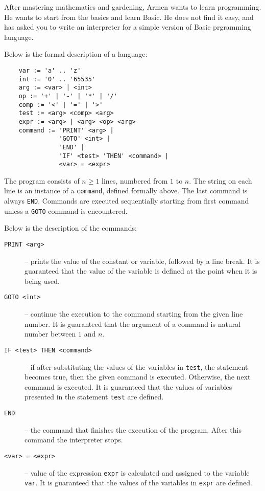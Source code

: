 
After mastering mathematics and gardening, Armen wants to learn programming.
He wants to start from the basics and learn Basic.
He does not find it easy, and has asked you to write an interpreter for a simple version of Basic prgramming language.

Below is the formal description of a language:
\begin{verbatim}
    var := 'a' .. 'z'
    int := '0' .. '65535'
    arg := <var> | <int>
    op := '+' | '-' | '*' | '/'
    comp := '<' | '=' | '>'
    test := <arg> <comp> <arg>
    expr := <arg> | <arg> <op> <arg>
    command := 'PRINT' <arg> |
               'GOTO' <int> |
               'END' |
               'IF' <test> 'THEN' <command> | 
               <var> = <expr>
\end{verbatim}

The program consists of $n \geq 1$ lines, numbered from $1$ to $n$.
The string on each line is an instance of a \texttt{command}, defined formally above.
The last command is always \texttt{END}.
Commands are executed sequentially starting from first command unless a \texttt{GOTO} command is encountered.

Below is the description of the commands:
\begin{description}
    \item[\texttt{PRINT <arg>}] -- prints the value of the constant or variable, followed by a line break.
    It is guaranteed that the value of the variable is defined at the point when it is being used.
    
    \item[\texttt{GOTO <int>}] -- continue the execution to the command starting from the given line number.
    It is guaranteed that the argument of a command is natural number between $1$ and $n$.
    
    \item[\texttt{IF <test> THEN <command>}] -- if after substituting the values of the variables in \texttt{test}, the statement becomes true, then the given command is executed.
    Otherwise, the next command is executed.
    It is guaranteed that the values of variables presented in the statement \texttt{test} are defined.
    
    \item[\texttt{END}] -- the command that finishes the execution of the program.
    After this command the interpreter stops.
    
    \item[\texttt{<var> = <expr>}] -- value of the expression \texttt{expr} is calculated and assigned to the variable \texttt{var}.
    It is guaranteed that the values of the variables in \texttt{expr} are defined.
\end{description}

